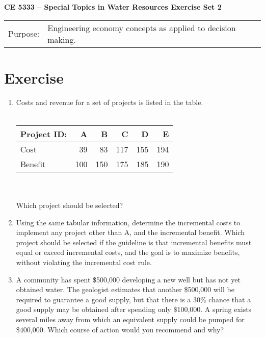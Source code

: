 \documentclass[12pt]{article}
\begin{document}
\begin{center}
{\textbf{{ CE 5333 -- Special Topics in Water Resources}  {Exercise Set 2}}}
\end{center}
\begingroup
\begin{tabular}{p{1in} p{5in}}
Purpose: & Engineering economy concepts as applied to decision making. \\
\end{tabular}
\endgroup
\section*{\small{Exercise}}
\begin{enumerate}
\item Costs and revenue for a set of projects is listed in the table. \\ ~\\
\begin{tabular}{lrrrrr}
Project ID: & A & B & C & D & E \\
\hline
\hline
Cost & 39 & 83 & 117 & 155 & 194 \\
Benefit & 100 & 150 & 175 & 185 & 190 \\
\end{tabular}\\~\\
Which project should be selected?  
\item Using the same tabular information, determine the incremental costs to implement any project other than A, and the incremental benefit.  Which project should be selected if the guideline is that incremental benefits must equal or exceed incremental costs, and the goal is to maximize benefits, without violating the incremental cost rule.
\item A community has spent \$500,000 developing a new well but has not yet obtained water.  The geologist estimates that another \$500,000 will be required to guarantee a good supply, but that there is a 30\% chance that a good supply may be obtained after spending only \$100,000.  A spring exists several miles away from which an equivalent supply could be pumped for \$400,000.   Which course of action would you recommend and why?
\end{enumerate}
\end{document}
